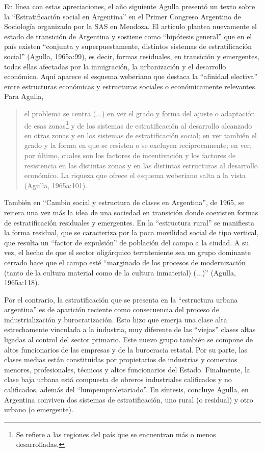 En línea con estas apreciaciones, el año siguiente Agulla presentó un texto sobre la ``Estratificación social en Argentina'' en el Primer Congreso Argentino de Sociología organizado por la SAS en Mendoza. El artículo plantea nuevamente el estado de transición de Argentina y sostiene como ``hipótesis general'' que en el país existen ``conjunta y superpuestamente, distintos sistemas de estratificación social'' (Agulla, 1965a:99), es decir, formas residuales, en transición y emergentes, todas ellas afectadas por la inmigración, la urbanización y el desarrollo económico. Aquí aparece el esquema weberiano que destaca la ``afinidad electiva'' entre estructuras económicas y estructuras sociales o económicamente relevantes. Para Agulla,

\begin{quote}
el problema se centra (...) en ver el grado y forma del ajuste o adaptación de esas zonas\footnote{Se refiere a las regiones del país que se encuentran más o menos desarrolladas.} y de los sistemas de estratificación al desarrollo alcanzado en otras zonas y en los sistemas de estratificación social; en ver también el grado y la forma en que se resisten o se excluyen recíprocamente; en ver, por último, cuales son los factores de incentivación y los factores de resistencia en las distintas zonas y en las distintas estructuras al desarrollo económico. La riqueza que ofrece el esquema weberiano salta a la vista (Agulla, 1965a:101).
\end{quote}

También en ``Cambio social y estructura de clases en Argentina'', de 1965, se reitera una vez más la idea de una sociedad en transición donde coexisten formas de estratificación residuales y emergentes. En la ``estructura rural'' se manifiesta la forma residual, que se caracteriza por la poca movilidad social de tipo vertical, que resulta un ``factor de expulsión'' de población del campo a la ciudad. A su vez, el hecho de que el sector oligárquico terrateniente sea un grupo dominante cerrado hace que el campo esté ``marginado de los procesos de modernización (tanto de la cultura material como de la cultura inmaterial) (...)'' (Agulla, 1965a:118).

Por el contrario, la estratificación que se presenta en la ``estructura urbana argentina'' es de aparición reciente como consecuencia del proceso de industrialización y burocratización. Esto hizo que emerja una clase alta estrechamente vinculada a la industria, muy diferente de las ``viejas'' clases altas ligadas al control del sector primario. Este nuevo grupo también se compone de altos funcionarios de las empresas y de la burocracia estatal. Por su parte, las clases medias están constituidas por propietarios de industrias y comercios menores, profesionales, técnicos y altos funcionarios del Estado. Finalmente, la clase baja urbana está compuesta de obreros industriales calificados y no calificados, además del ``lumpemproletariado''. En síntesis, concluye Agulla, en Argentina conviven dos sistemas de estratificación, uno rural (o residual) y otro urbano (o emergente).

